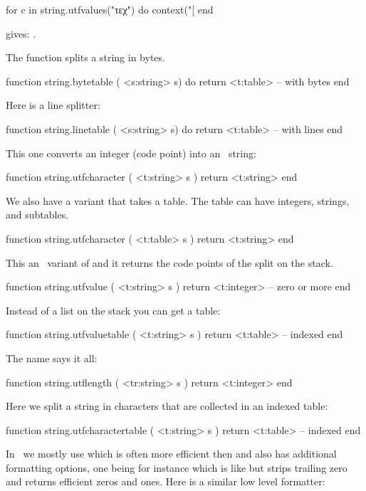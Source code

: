 \startbuffer
\startluacode
for c in string.utfvalues("τεχ") do
    context("[%
end
\stopluacode
\stopbuffer

\typebuffer

gives: \inlinebuffer.

The  function splits a string in bytes.

\starttyping[option=LUA]
function string.bytetable ( <s:string> s) do
    return <t:table> -- with bytes
end
\stoptyping

Here is a line splitter:

\starttyping[option=LUA]
function string.linetable  ( <s:string> s) do
    return <t:table> -- with lines
end
\stoptyping

This one converts an integer (code point) into an \UTF\ string:

\starttyping[option=LUA]
function string.utfcharacter ( <t:string> s )
    return <t:string>
end
\stoptyping

We also have a variant that takes a table. The table can have integers, strings,
and subtables.

\starttyping[option=LUA]
function string.utfcharacter ( <t:table> s )
    return <t:string>
end
\stoptyping

This an \ variant of  and it returns the code points of
the split on the stack.

\starttyping[option=LUA]
function string.utfvalue ( <t:string> s )
    return <t:integer> -- zero or more
end
\stoptyping

Instead of a list on the stack you can get a table:

\starttyping[option=LUA]
function string.utfvaluetable ( <t:string> s )
    return <t:table> -- indexed
end
\stoptyping

The name says it all:

\starttyping[option=LUA]
function string.utflength ( <tr:string> s )
    return <t:integer>
end
\stoptyping

Here we split a string in characters that are collected in an indexed table:

\starttyping[option=LUA]
function string.utfcharactertable ( <t:string> s )
    return <t:table> -- indexed
end
\stoptyping

In \CONTEXT\ we mostly use  which is often more
efficient then  and also has additional formatting options,
one being for instance  which is like  but strips trailing zero
and returns efficient zeros and ones. Here is a similar low level formatter:

